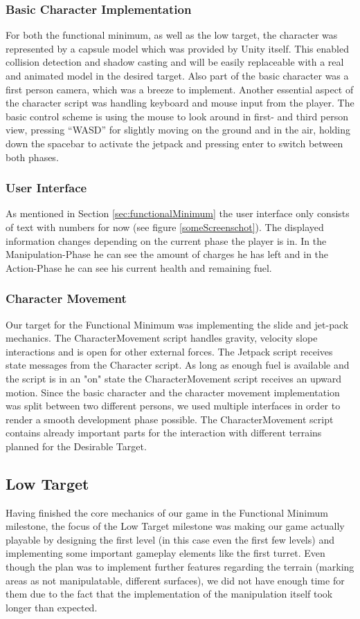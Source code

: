 \documentclass[12pt, letterpaper]{scrartcl}
\begin{document}
	\subsubsection{Basic Character Implementation}
	For both the functional minimum, as well as the low target, the character was represented by a capsule model which was provided by Unity itself. This enabled collision detection and shadow casting and will be easily replaceable with a real and animated model in the desired target. Also part of the basic character was a first person camera, which was a breeze to implement. Another essential aspect of the character script was handling keyboard and mouse input from the player. The basic control scheme is using the mouse to look around in first- and third person view, pressing “WASD” for slightly moving on the ground and in the air, holding down the spacebar to activate the jetpack and pressing enter to switch between both phases.
	
	\subsubsection{User Interface}
	As mentioned in Section \ref{sec:functionalMinimum} the user interface only consists of text with numbers for now (see figure \ref{someScreenschot}). The displayed information changes depending on the current phase the player is in. In the Manipulation-Phase he can see the amount of charges he has left and in the Action-Phase he can see his current health and remaining fuel.
	
	\subsubsection{Character Movement}
	Our target for the Functional Minimum was implementing the slide and jet-pack mechanics. The CharacterMovement script handles gravity, velocity slope interactions and is open for other external forces. The Jetpack script receives state messages from the Character script. As long as enough fuel is available and the script is in an "on" state the CharacterMovement script receives an upward motion. Since the basic character and the character movement implementation was split between two different persons, we used multiple interfaces in order to render a smooth development phase possible.
	The CharacterMovement script contains already important parts for the interaction with different terrains planned for the Desirable Target.
	
	\subsection{Low Target}
	Having finished the core mechanics of our game in the Functional Minimum milestone, the focus of the Low Target milestone was making our game actually playable by designing the first level (in this case even the first few levels) and implementing some important gameplay elements like the first turret. Even though the plan was to implement further features regarding the terrain (marking areas as not manipulatable, different surfaces), we did not have enough time for them due to the fact that the implementation of the manipulation itself took longer than expected.
	
\end{document}
